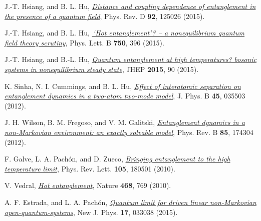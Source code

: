 \documentclass[11pt,a4paper]{article}
\begin{document}
\begin{thebibliography}{99}
    J.-T. Hsiang, and B. L. Hu, \href{https://doi.org/10.1103/PhysRevD.92.125026}{\textit{Distance and coupling dependence of entanglement in the presence of a quantum field}}, Phys. Rev. D \textbf{92}, 125026 (2015).%
    
    J.-T. Hsiang, and B. L. Hu,  \href{https://doi.org/10.1016/j.physletb.2015.09.047}{\textit{\,`Hot entanglement'? -- a nonequilibrium quantum field theory scrutiny}}, Phys. Lett. B \textbf{750}, 396 (2015).%
    
    J.-T. Hsiang, and B.-L. Hu, \href{https://doi.org/10.1007/JHEP11(2015)090}{\textit{Quantum entanglement at high temperatures? bosonic systems in nonequilibrium steady state}}, JHEP \textbf{2015}, 90 (2015).

    K. Sinha, N. I. Cummings, and B. L. Hu, \href{https://doi.org/10.1088/0953-4075/45/3/035503}{\textit{Effect of interatomic separation on entanglement dynamics in a two-atom two-mode model}}, J. Phys. B \textbf{45}, 035503 (2012).%

J. H. Wilson, B. M. Fregoso, and V. M. Galitski, \href{https://doi.org/10.1103/PhysRevB.85.174304}{\textit{Entanglement dynamics in a non-Markovian environment: an exactly solvable model}}, Phys. Rev. B \textbf{85}, 174304 (2012).
    
    F. Galve, L. A. Pach\'{o}n, and D. Zueco, \href{https://doi.org/10.1103/PhysRevLett.105.180501}{\textit{Bringing entanglement to the high temperature limit}}, Phys. Rev. Lett. \textbf{105}, 180501 (2010).

    V. Vedral, \href{https://doi.org/10.1038/468769a}{\textit{Hot entanglement}}, Nature \textbf{468}, 769 (2010).%
    
    A. F. Estrada, and L. A. Pach\'on,  \href{https://doi.org/10.1088/1367-2630/17/3/033038}{\textit{Quantum limit for driven linear non-Markovian open-quantum-systems}}, New J. Phys. \textbf{17}, 033038 (2015).%


\end{thebibliography}
\end{document}
